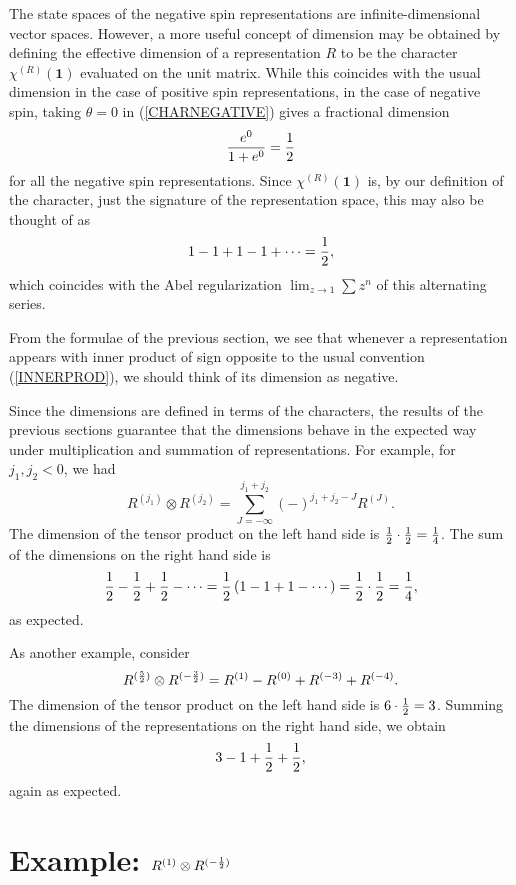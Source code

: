 \documentclass[a4paper,dvips,12pt]{article}
\newcommand {\half} {{1 \over 2}}
\begin{document}
    The state spaces of the negative spin representations are
    infinite-dimensional vector spaces.  However, a more useful
    concept of dimension may be obtained by defining the effective
    dimension of a representation $R$ to be the character
    $\chi^{(R)}(\mathbf 1)$ evaluated on the unit matrix.  While this
    coincides with the usual dimension in the case of positive
    spin representations, in the case of negative
    spin, taking $\theta = 0$ in (\ref{CHARNEGATIVE})
    gives a fractional dimension
    \[
        {e^0 \over 1 + e^0} = \half
    \]
    for all the negative spin representations.
    Since $\chi^{(R)}(\mathbf 1)$
    is, by our definition of the character, just the signature of the
    representation space, this may also be thought of as
    \[
        1 - 1 + 1 - 1 + \cdots = \half,
    \]
    which coincides with the Abel regularization $\lim_{z\to 1}\sum z^n$ of this
    alternating series.

    From the formulae of the previous section, we see that
    whenever a representation appears with inner product
    of sign opposite to the
    usual convention (\ref{INNERPROD}),
    we should think of its dimension as
    negative.

    Since the dimensions are defined in terms of the characters,
    the results of the previous sections guarantee that the
    dimensions behave in the expected way under multiplication and
    summation of representations.  For example, for $j_1, j_2 < 0$, we
    had
    \begin{equation}
        R^{(j_1)}\otimes R^{(j_2)} = \sum_{J = -\infty}^{j_1 + j_2}
        (-)^{j_1 + j_2 - J} R^{(J)}.
    \end{equation}
    The dimension of the tensor product on the left hand side is
    $\half\cdot\half = {1\over 4}$.  The sum of the dimensions on
    the right hand side is
    \[
        \half - \half + \half - \cdots = \half\, (1 - 1 + 1 - \cdots)
            = \half\cdot \half = {1\over 4},
    \]
    as expected.

    As another example, consider
    \[
        R^{({5\over 2})}\otimes R^{(-{3\over 2})}
          = R^{(1)} - R^{(0)} + R^{(-3)} + R^{(-4)}.
    \]
    The dimension of the tensor product on the left hand side is
    $6 \cdot \half = 3$.  Summing the dimensions of the representations
    on the right hand
    side, we obtain
    \[
        3 - 1 + \half + \half,
    \]
    again as expected.

    \section{Example: $R^{(1)}\otimes R^{(-\half)}$}
\end{document}
